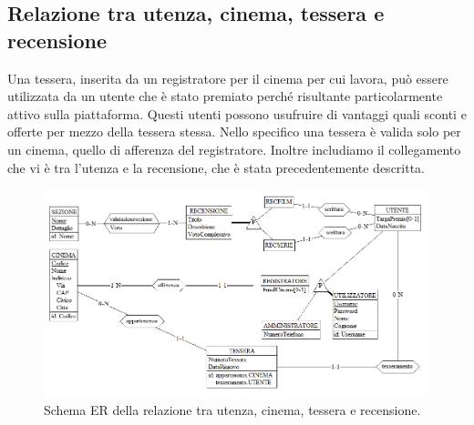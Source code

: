 \documentclass[a4paper,12pt]{report}
\begin{document}
\subsection{Relazione tra utenza, cinema, tessera e recensione}
Una tessera, inserita da un registratore per il cinema per cui lavora, può essere utilizzata da un utente che è stato premiato perché risultante particolarmente attivo sulla piattaforma. Questi utenti possono usufruire di vantaggi quali sconti e offerte per mezzo della tessera stessa. Nello specifico una tessera è valida solo per un cinema, quello di afferenza del registratore.
Inoltre includiamo il collegamento che vi è tra l'utenza e la recensione, che è stata precedentemente descritta.
\begin{figure}[H]
	\centering
	\includegraphics[width=450pt]{ER/utenzacinematesserarecensione.png}
	\caption{Schema ER della relazione tra utenza, cinema, tessera e recensione.}
\end{figure}
\end{document}
